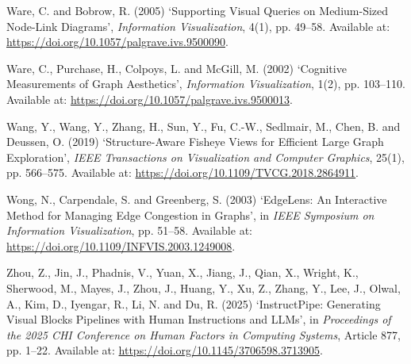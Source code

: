 \documentclass[11pt,a4paper,oneside,extrafontsizes]{memoir}
\begin{document}
Ware, C. and Bobrow, R. (2005) ‘Supporting Visual Queries on Medium-Sized Node-Link Diagrams’, \emph{Information Visualization}, 4(1), pp. 49–58. Available at: \href{https://doi.org/10.1057/palgrave.ivs.9500090}{https://doi.org/10.1057/palgrave.ivs.9500090}.

Ware, C., Purchase, H., Colpoys, L. and McGill, M. (2002) ‘Cognitive Measurements of Graph Aesthetics’, \emph{Information Visualization}, 1(2), pp. 103–110. Available at: \href{https://doi.org/10.1057/palgrave.ivs.9500013}{https://doi.org/10.1057/palgrave.ivs.9500013}.

Wang, Y., Wang, Y., Zhang, H., Sun, Y., Fu, C.-W., Sedlmair, M., Chen, B. and Deussen, O. (2019) ‘Structure-Aware Fisheye Views for Efficient Large Graph Exploration’, \emph{IEEE Transactions on Visualization and Computer Graphics}, 25(1), pp. 566–575. Available at: \href{https://doi.org/10.1109/TVCG.2018.2864911}{https://doi.org/10.1109/TVCG.2018.2864911}.

Wong, N., Carpendale, S. and Greenberg, S. (2003) ‘EdgeLens: An Interactive Method for Managing Edge Congestion in Graphs’, in \emph{IEEE Symposium on Information Visualization}, pp. 51–58. Available at: \href{https://doi.org/10.1109/INFVIS.2003.1249008}{https://doi.org/10.1109/INFVIS.2003.1249008}.

Zhou, Z., Jin, J., Phadnis, V., Yuan, X., Jiang, J., Qian, X., Wright, K., Sherwood, M., Mayes, J., Zhou, J., Huang, Y., Xu, Z., Zhang, Y., Lee, J., Olwal, A., Kim, D., Iyengar, R., Li, N. and Du, R. (2025) ‘InstructPipe: Generating Visual Blocks Pipelines with Human Instructions and LLMs’, in \emph{Proceedings of the 2025 CHI Conference on Human Factors in Computing Systems}, Article 877, pp. 1–22. Available at: \href{https://doi.org/10.1145/3706598.3713905}{https://doi.org/10.1145/3706598.3713905}.
\end{document}
